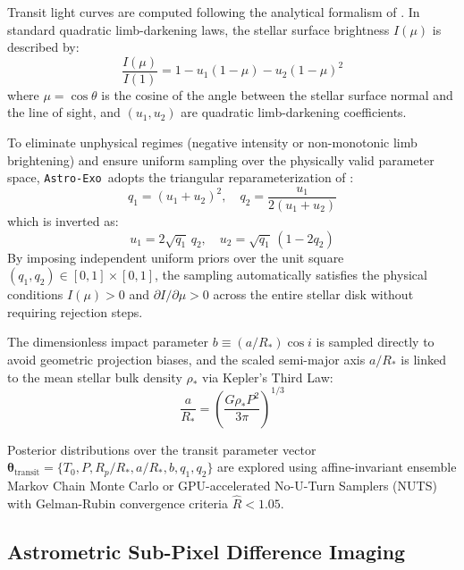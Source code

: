 \documentclass[twocolumn,trackchanges]{aastex631}
\newcommand{\astroexo}{\texttt{Astro-Exo}}
\begin{document}
Transit light curves are computed following the analytical formalism of \citet{MandelAgol2002}. In standard quadratic limb-darkening laws, the stellar surface brightness $I(\mu)$ is described by:
\begin{equation}
    \frac{I(\mu)}{I(1)} = 1 - u_1 (1 - \mu) - u_2 (1 - \mu)^2
\end{equation}
where $\mu = \cos \theta$ is the cosine of the angle between the stellar surface normal and the line of sight, and $(u_1, u_2)$ are quadratic limb-darkening coefficients. 

To eliminate unphysical regimes (negative intensity or non-monotonic limb brightening) and ensure uniform sampling over the physically valid parameter space, \astroexo\ adopts the triangular reparameterization of \citet{Kipping2013}:
\begin{equation}
    q_1 = (u_1 + u_2)^2, \quad q_2 = \frac{u_1}{2(u_1 + u_2)}
\end{equation}
which is inverted as:
\begin{equation}
    u_1 = 2\sqrt{q_1}\,q_2, \quad u_2 = \sqrt{q_1}\,(1 - 2q_2)
\end{equation}
By imposing independent uniform priors over the unit square $(q_1, q_2) \in [0, 1] \times [0, 1]$, the sampling automatically satisfies the physical conditions $I(\mu) > 0$ and $\partial I / \partial \mu > 0$ across the entire stellar disk without requiring rejection steps.

The dimensionless impact parameter $b \equiv (a/R_*) \cos i$ is sampled directly to avoid geometric projection biases, and the scaled semi-major axis $a/R_*$ is linked to the mean stellar bulk density $\rho_*$ via Kepler's Third Law:
\begin{equation}
    \frac{a}{R_*} = \left( \frac{G \rho_* P^2}{3\pi} \right)^{1/3}
\end{equation}

Posterior distributions over the transit parameter vector $\boldsymbol{\theta}_{\text{transit}} = \{T_0, P, R_p/R_*, a/R_*, b, q_1, q_2\}$ are explored using affine-invariant ensemble Markov Chain Monte Carlo \citep[\texttt{emcee};][]{ForemanMackey2013} or GPU-accelerated No-U-Turn Samplers (NUTS) with Gelman-Rubin convergence criteria $\hat{R} < 1.05$.

\subsection{Astrometric Sub-Pixel Difference Imaging}
\label{subsec:astrometry}
\end{document}
